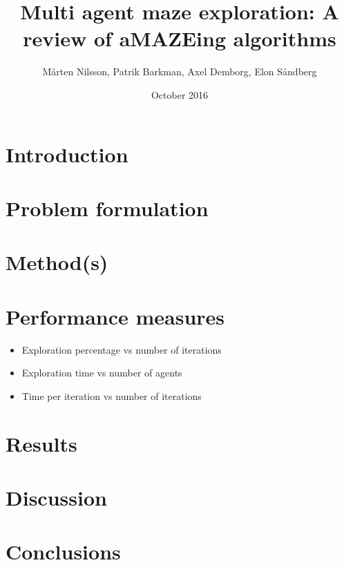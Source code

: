 \documentclass{article}
\title{ Multi agent maze exploration: A review of aMAZEing algorithms }
\author{ Mårten Nilsson, Patrik Barkman, Axel Demborg, Elon Såndberg }
\date{October 2016}
\begin{document}
\maketitle


\section{Introduction}

\section{Problem formulation}

\section{Method(s)}

\section{Performance measures}
\begin{itemize}
\item Exploration percentage vs number of iterations
\item Exploration time vs number of agents
\item Time per iteration vs number of iterations
\end{itemize}

\section{Results}

\section{Discussion}

\section{Conclusions}
\end{document}
